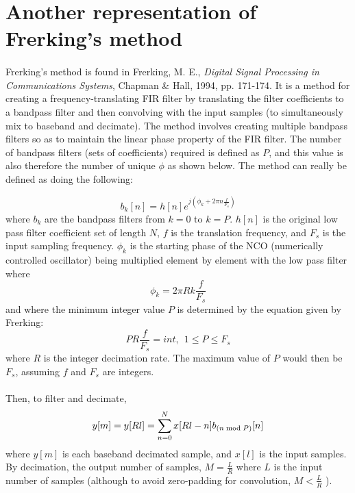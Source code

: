 \documentclass{article}
\begin{document}
    \section{Another representation of Frerking's method}
        \paragraph{}
        Frerking's method is found in Frerking, M. E., \textit{Digital Signal Processing in Communications Systems}, Chapman \& Hall, 1994, pp. 171-174. It is a method for creating a frequency-translating FIR filter by translating the filter coefficients to a bandpass filter and then convolving with the input samples (to simultaneously mix to baseband and decimate). The method involves creating multiple bandpass filters so as to maintain the linear phase property of the FIR filter. The number of bandpass filters (sets of coefficients) required is defined as $P$, and this value is also therefore the number of unique ${\phi}$ as shown below. The method can really be defined as doing the following:

        \begin{equation} \label{eq1}
            {{b}_k[n]} = h[n]e^{j({\phi}_k + 2{\pi}n\frac{f}{{F}_s})}
        \end{equation}
        where ${b}_k$ are the bandpass filters from $k=0$ to $k=P$. ${h[n]}$ is the original low pass filter coefficient set of length $N$, $f$ is the translation frequency, and ${F}_s$ is the input sampling frequency. ${{\phi}_k}$ is the starting phase of the NCO (numerically controlled oscillator) being multiplied element by element with the low pass filter where
        \begin{equation}
            {\phi}_k = 2{\pi}Rk{\frac{f}{{F}_s}}
        \end{equation}
        and where the minimum integer value $P$ is determined by the equation given by Frerking:
        \begin{equation}
            PR\frac{f}{{F}_s} = int,\ \ 1 \leq P \leq {F}_s
        \end{equation}
        where $R$ is the integer decimation rate. The maximum value of $P$ would then be ${F}_s$, assuming $f$ and ${F}_s$ are integers.
        \paragraph{}
        Then, to filter and decimate,
        \begin{equation}
            {y[m]} = {y[Rl]} = \sum\limits_{n=0}^N x[Rl-n]{b}_{(n{\bmod}P)}[n]
        \end{equation}
        where ${y[m]}$ is each baseband decimated sample,  and ${x[l]}$ is the input samples. By decimation, the output number of samples, $M = \frac{L}{R}$ where $L$ is the input number of samples (although to avoid zero-padding for convolution, $M< {\frac{L}{R}}$ ).
\end{document}
